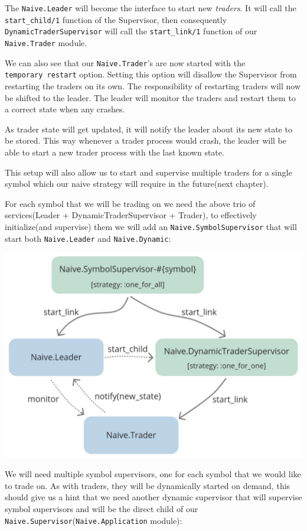 \documentclass[
  oneside]{book}
\begin{document}
The \texttt{Naive.Leader} will become the interface to start new \emph{traders}. It will call the \texttt{start\_child/1} function of the Supervisor, then consequently \texttt{DynamicTraderSupervisor} will call the \texttt{start\_link/1} function of our \texttt{Naive.Trader} module.

We can also see that our \texttt{Naive.Trader}'s are now started with the \texttt{temporary\ restart} option. Setting this option will disallow the Supervisor from restarting the traders on its own. The responsibility of restarting traders will now be shifted to the leader. The leader will monitor the traders and restart them to a correct state when any crashes.

As trader state will get updated, it will notify the leader about its new state to be stored. This way whenever a trader process would crash, the leader will be able to start a new trader process with the last known state.

This setup will also allow us to start and supervise multiple traders for a single symbol which our naive strategy will require in the future(next chapter).

\newpage

For each symbol that we will be trading on we need the above trio of services(Leader + DynamicTraderSupervisor + Trader), to effectively initialize(and supervise) them we will add an \texttt{Naive.SymbolSupervisor} that will start both \texttt{Naive.Leader} and \texttt{Naive.Dynamic}:

\begin{center}\includegraphics[width=0.4\linewidth]{images/chapter_05_04_symbol_sup} \end{center}

We will need multiple symbol supervisors, one for each symbol that we would like to trade on. As with traders, they will be dynamically started on demand, this should give us a hint that we need another dynamic supervisor that will supervise symbol supervisors and will be the direct child of our \texttt{Naive.Supervisor}(\texttt{Naive.Application} module):
\end{document}

